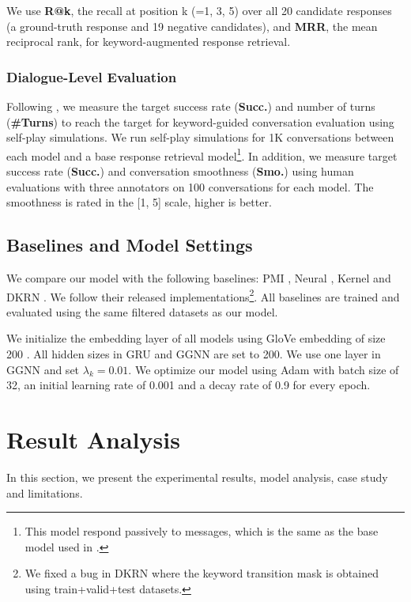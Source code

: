 \documentclass[letterpaper]{article} %
\begin{document}
We use \textbf{R@k}, the recall at position k (=1, 3, 5) over all 20 candidate responses (a ground-truth response and 19 negative candidates), and \textbf{MRR}, the mean reciprocal rank, for keyword-augmented response retrieval.

\subsubsection{Dialogue-Level Evaluation}
Following \cite{tang2019target}, we measure the target success rate (\textbf{Succ.}) and number of turns (\textbf{\#Turns}) to reach the target for keyword-guided conversation evaluation using self-play simulations. We run self-play simulations for 1K conversations between each model and a base response retrieval model\footnote{This model respond passively to messages, which is the same as the base model used in \cite{tang2019target}.}. In addition, we measure target success rate (\textbf{Succ.}) and conversation smoothness (\textbf{Smo.}) using human evaluations with three annotators on 100 conversations for each model. The smoothness is rated in the [1, 5] scale, higher is better.

\subsection{Baselines and Model Settings}
\label{sec: baselines}
We compare our model with the following baselines: PMI \cite{tang2019target}, Neural \cite{tang2019target}, Kernel \cite{tang2019target} and DKRN \cite{qin2020dynamic}. We follow their released implementations\footnote{We fixed a bug in DKRN where the keyword transition mask is obtained using train+valid+test datasets.}. All baselines are trained and evaluated using the same filtered datasets as our model.

We initialize the embedding layer of all models using GloVe embedding of size 200 \cite{pennington2014glove}. All hidden sizes in GRU and GGNN are set to 200. We use one layer in GGNN and set $\lambda_k = 0.01$. We optimize our model using Adam \cite{kingma2014adam} with batch size of 32, an initial learning rate of 0.001 and a decay rate of 0.9 for every epoch.

\section{Result Analysis}
\label{sec: result analysis}
In this section, we present the experimental results, model analysis, case study and limitations.
\end{document}
